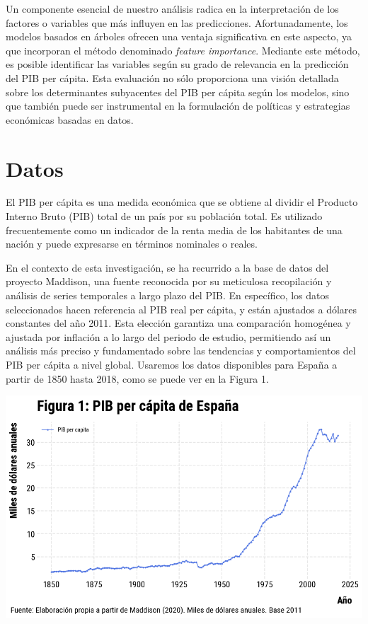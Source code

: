 \documentclass[12pt]{article}
\begin{document}
Un componente esencial de nuestro análisis radica en la interpretación de los factores o variables que más influyen en las predicciones. Afortunadamente, los modelos basados en árboles ofrecen una ventaja significativa en este aspecto, ya que incorporan el método denominado \textit{feature importance}. Mediante este método, es posible identificar las variables según su grado de relevancia en la predicción del PIB per cápita. Esta evaluación no sólo proporciona una visión detallada sobre los determinantes subyacentes del PIB per cápita según los modelos, sino que también puede ser instrumental en la formulación de políticas y estrategias económicas basadas en datos.

\section{Datos}

El PIB per cápita es una medida económica que se obtiene al dividir el Producto Interno Bruto (PIB) total de un país por su población total. Es utilizado frecuentemente como un indicador de la renta media de los habitantes de una nación y puede expresarse en términos nominales o reales.

En el contexto de esta investigación, se ha recurrido a la base de datos del proyecto Maddison, una fuente reconocida por su meticulosa recopilación y análisis de series temporales a largo plazo del PIB. En específico, los datos seleccionados hacen referencia al PIB real per cápita, y están ajustados a dólares constantes del año 2011. Esta elección garantiza una comparación homogénea y ajustada por inflación a lo largo del periodo de estudio, permitiendo así un análisis más preciso y fundamentado sobre las tendencias y comportamientos del PIB per cápita a nivel global.	Usaremos los datos disponibles para España a partir de 1850 hasta 2018, como se puede ver en la Figura 1.

\begin{center}
\includegraphics[scale=0.65]{fig_1_pibpc}
\end{center}
\end{document}
